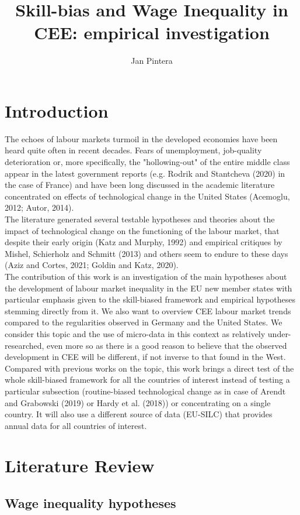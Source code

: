 \documentclass{article}
\title{Skill-bias and Wage Inequality in CEE: empirical investigation}
\author{Jan Pintera}
\date{}
\begin{document}
\maketitle
\section{Introduction}
The echoes of labour markets turmoil in the developed economies have been heard quite often in recent decades. Fears of unemployment, job-quality deterioration or, more specifically, the "hollowing-out" of the entire middle class appear in the latest government reports (e.g. Rodrik and Stantcheva (2020) in the case of France) and have been long discussed in the academic literature concentrated on effects of technological change in the United States (Acemoglu, 2012; Autor, 2014).\\
The literature generated several testable hypotheses and theories about the impact of technological change on the functioning of the labour market, that despite their early origin (Katz and Murphy, 1992) and empirical critiques by Mishel, Schierholz and Schmitt (2013) and others seem to endure to these days (Aziz and Cortes, 2021; Goldin and Katz, 2020).\\
The contribution of this work is an investigation of the main hypotheses about the development of labour market inequality in the EU new member states with particular emphasis given to the skill-biased framework and empirical hypotheses stemming directly from it. We also want to overview CEE labour market trends compared to the regularities observed in Germany and the United States. We consider this topic and the use of micro-data in this context as relatively under-researched, even more so as there is a good reason to believe that the observed development in CEE will be different, if not inverse to that found in the West. Compared with previous works on the topic, this work brings a direct test of the whole skill-biased framework for all the countries of interest instead of testing a particular subsection (routine-biased technological change as in case of Arendt and Grabowski (2019) or Hardy et al. (2018)) or concentrating on a single country. It will also use a different source of data (EU-SILC) that provides annual data for all countries of interest.

\section{Literature Review}
\subsection{Wage inequality hypotheses}
\end{document}
